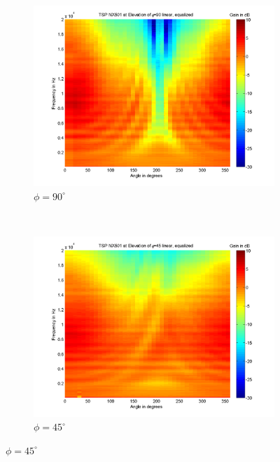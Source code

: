 \clearpage
\begin{figure}[t!]
        \centering
        
        \caption[Measurement results {\nexus} (1), mid-air]{{\nexus}, labelled with number 1, measurements in mid-air, equalized}
        \label{fig:res_NX501_pluis}

        \begin{subfigure}[t]{0.5\textwidth}
			    \caption{$\phi=90^\circ$}
			    \label{fig:res_NX501_pluis_90}
                \centering
    			\includegraphics[height=0.28\textheight]{afbeeldingen/plots/results/NX501_TSP_090_lin_eq.png}
        \end{subfigure}~
        \begin{subfigure}[t]{0.5\textwidth}
			    \caption{$\phi=45^\circ$}
			    \label{fig:res_NX501_pluis_45}
                \centering
    			\includegraphics[height=0.28\textheight]{afbeeldingen/plots/results/NX501_TSP_045_lin_eq.png}
        \end{subfigure}
        

\end{figure}
